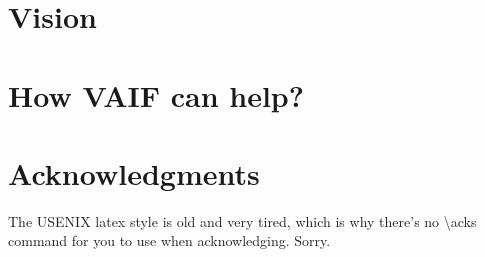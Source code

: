 \section{Vision}




\section{How VAIF can help?}



\section*{Acknowledgments}

The USENIX latex style is old and very tired, which is why
there's no \textbackslash{}acks command for you to use when
acknowledging. Sorry.






